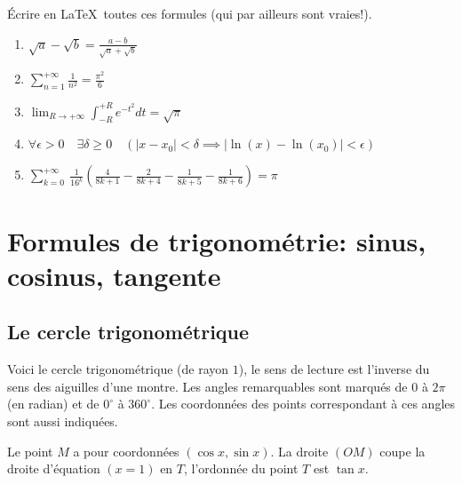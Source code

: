 \documentclass[class=report,crop=false]{standalone}
\begin{document}

\begin{miniexercices}
\'Ecrire en \LaTeX\ toutes ces formules (qui par ailleurs sont vraies!).

\begin{enumerate}
  \item $\displaystyle \sqrt{a}-\sqrt{b} = \frac{a-b}{\sqrt a + \sqrt b}$
  \item $\displaystyle \sum_{n=1}^{+\infty}{\frac{1}{n^2}} = \frac{\pi^2}{6}$
  \item $\displaystyle \lim_{R\to+\infty} \int_{-R}^{+R} e^{-t^2} dt = \sqrt{\pi}$
  \item $\displaystyle \forall \epsilon>0 \quad \exists \delta \ge 0 \quad (|x-x_0|<\delta \implies |\ln(x)-\ln(x_0)|<\epsilon)$
  \item $\displaystyle \sum_{k=0}^{+\infty} \ \frac{1}{16^k} \left(\frac{4}{8k+1}-\frac{2}{8k+4}-\frac{1}{8k+5}-\frac{1}{8k+6} \right) = \pi$
\end{enumerate}
\end{miniexercices}

\newpage
\section{Formules de trigonométrie: sinus, cosinus, tangente}

\subsection{Le cercle trigonométrique}




Voici le cercle trigonométrique (de rayon $1$),
le sens de lecture est l'inverse du sens des aiguilles d'une montre.
Les angles remarquables sont marqués de $0$ à $2 \pi$ (en radian) et de $0^\circ$ à $360^\circ$.
Les coordonnées des points correspondant à ces angles sont aussi indiquées.



Le point $M$ a pour coordonnées $(\cos x,\sin x)$.
La droite $(OM)$ coupe la droite d'équation $(x=1)$ en $T$,
l'ordonnée du point $T$ est $\tan x$.
\end{document}
